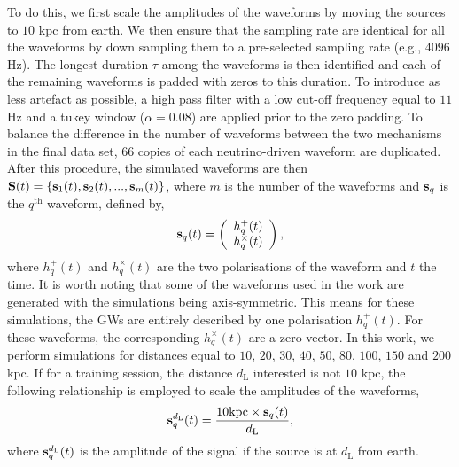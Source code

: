 \documentclass[aps,twocolumn,showpacs,groupedaddress, nofootinbib]{revtex4}  %
\begin{document}
To do this, we first scale the amplitudes of the waveforms by moving the sources to $10$ kpc from earth.
We then ensure that the sampling rate are identical for all the waveforms by down sampling 
them to a pre-selected sampling rate (e.g., $4096$Hz).
The longest duration $\tau$ among the waveforms is then identified and each of the remaining waveforms is padded with zeros
to this duration.
To introduce as less artefact as possible, a high pass filter with a low cut-off frequency equal to $11$Hz 
and a tukey window ($\alpha = 0.08$) are applied prior to the zero padding. 
To balance the difference in the number of waveforms 
between the two mechanisms in the final data set, $66$ copies of each neutrino-driven waveform are duplicated.
After this procedure, the simulated 
waveforms are then $\bold{S}(t) = \{\bold{s}_{1}(t), \bold{s}_{2}(t), ..., \bold{s}_{m}(t)\}$, where $m$ is the number of the waveforms and 
$\bold{s}_{q}$ is the $q^{\text{th}}$ waveform, defined by,
\begin{equation}\label{eq:ht}
 \bold{s}_q(t) = \left(\begin{array}{c}
                        h_q^+(t) \\
                        h_q^\times(t)
                       \end{array}\right),
\end{equation}
where $h_q^+(t)$ and $h_q^\times(t)$ are the two polarisations of the waveform and $t$ the time. 
It is worth noting that some of the waveforms used in the work are generated with the simulations being axis-symmetric.
This means for these simulations, the \acp{GW} are entirely described by one polarisation $h_q^+(t)$. 
For these waveforms, the corresponding $h_q^\times(t)$ are a zero vector. 
In this work, we perform simulations for distances equal to $10$, $20$, $30$, $40$, $50$, $80$, $100$, $150$ and $200$ kpc.
If for a training session, the distance $d_\text{L}$ interested is not $10$ kpc, the following relationship is employed to scale the amplitudes of the waveforms,
\begin{equation}\label{eq:sap}
 \bold{s}^{d_\text{L}}_q(t) =  \frac{10\text{kpc}\times\bold{s}_q(t)}{d_\text{L}},
\end{equation}
where $\bold{s}^{d_\text{L}}_q(t)$ is the amplitude of the signal if the source is at $d_\text{L}$ from earth.
\end{document}

